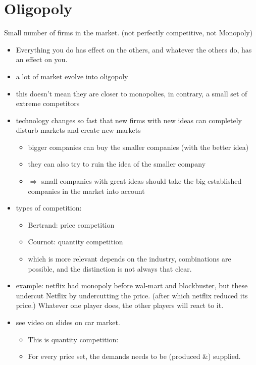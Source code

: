 \documentclass[12pt, a4paper, titlepage]{extarticle}
\begin{document}
\section{Oligopoly}
    Small number of firms in the market. (not perfectly competitive, not Monopoly) 
    \begin{itemize}
        \item Everything you do has effect on the others, and whatever the others do, has an effect on you.
        \item a lot of market evolve into oligopoly
        \item this doesn't mean they are closer to monopolies, in contrary, a small set of extreme competitors
        \item technology changes so fast that new firms with new ideas can completely disturb markets and create new markets
        \begin{itemize}
            \item bigger companies can buy the smaller companies (with the better idea)
            \item they can also try to ruin the idea of the smaller company
            \item $\Rightarrow$ small companies with great ideas should take the big established companies in the market into account
        \end{itemize}
        \item types of competition:
        \begin{itemize}
            \item Bertrand: price competition
            \item Cournot: quantity competition
            \item which is more relevant depends on the industry, combinations are possible, and the distinction is not always that clear.
        \end{itemize}
        \item example: netflix had monopoly before wal-mart and blockbuster, but these undercut Netflix by undercutting the price. (after which netflix reduced its price.) Whatever one player does, the other players will react to it.
        \item see video on slides on car market.
        \begin{itemize}
            \item This is quantity competition:
            \item For every price set, the demands needs to be (produced \&) supplied.  

\end{itemize}
\end{itemize}
\end{document}
